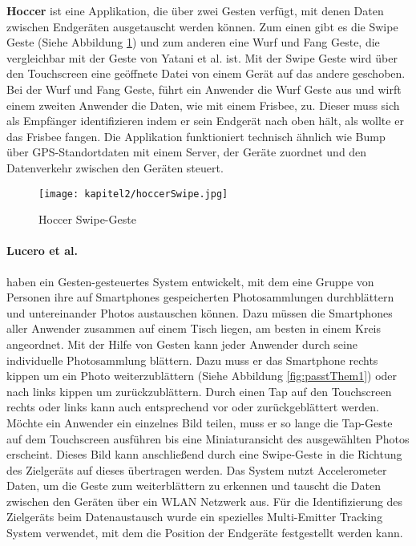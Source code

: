\textbf{Hoccer} ist eine Applikation, die über zwei Gesten verfügt, mit denen Daten zwischen Endgeräten ausgetauscht werden können. Zum einen gibt es die Swipe Geste (Siehe Abbildung \ref{fig:hocSwipe}) und zum anderen eine Wurf und Fang Geste, die vergleichbar mit der Geste von Yatani et al. ist. Mit der Swipe Geste wird über den Touchscreen eine geöffnete Datei von einem Gerät auf das andere geschoben. Bei der Wurf und Fang Geste, führt ein Anwender die Wurf Geste aus und wirft einem zweiten Anwender die Daten, wie mit einem Frisbee, zu. Dieser muss sich als Empfänger identifizieren indem er sein Endgerät nach oben hält, als wollte er das Frisbee fangen. Die Applikation funktioniert technisch ähnlich wie Bump über \acs{GPS}-Standortdaten mit einem Server, der Geräte zuordnet und den Datenverkehr zwischen den Geräten steuert. \cite{Hoccer:Online}

\begin{figure}[H]
	\centering
	\texttt{[image: kapitel2/hoccerSwipe.jpg]}
	\caption{Hoccer Swipe-Geste \cite{HoccerPics:Online}}
	\label{fig:hocSwipe}
\end{figure}

\paragraph{Lucero et al.} \cite{Lucero:2011:PCU:1978942.1979201} haben ein Gesten-gesteuertes System entwickelt, mit dem eine Gruppe von Personen ihre auf Smartphones gespeicherten Photosammlungen durchblättern und untereinander Photos austauschen können. Dazu müssen die Smartphones aller Anwender zusammen auf einem Tisch liegen, am besten in einem Kreis angeordnet. Mit der Hilfe von Gesten kann jeder Anwender durch seine individuelle Photosammlung blättern. Dazu muss er das Smartphone rechts kippen um ein Photo weiterzublättern (Siehe Abbildung \ref{fig:passtThem1}) oder nach links kippen um zurückzublättern. Durch einen Tap auf den Touchscreen rechts oder links kann auch entsprechend vor oder zurückgeblättert werden. Möchte ein Anwender ein einzelnes Bild teilen, muss er so lange die Tap-Geste auf dem Touchscreen ausführen bis eine Miniaturansicht des ausgewählten Photos erscheint. Dieses Bild kann anschließend durch eine Swipe-Geste in die Richtung des Zielgeräts auf dieses übertragen werden. Das System nutzt Accelerometer Daten, um die Geste zum weiterblättern zu erkennen und tauscht die Daten zwischen den Geräten über ein WLAN Netzwerk aus. Für die Identifizierung des Zielgeräts beim Datenaustausch wurde ein spezielles Multi-Emitter Tracking System verwendet, mit dem die Position der Endgeräte festgestellt werden kann.

